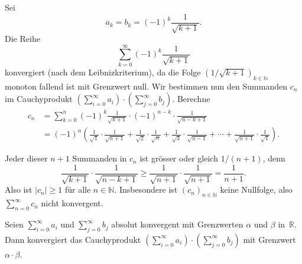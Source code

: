 \documentclass[../main.tex]{subfiles}
\begin{document}
\begin{example}
  Sei 
  \[
    a_k = b_k = {(-1)}^k \frac{1}{\sqrt{k+1}}.
  \]
  Die Reihe
  \[
    \sum_{k=0}^{\infty} {(-1)}^k \frac{1}{\sqrt{k+1}}
  \]
  konvergiert (nach dem Leibnizkriterium),
  da die Folge ${(1/\sqrt{k+1})}_{k \in \mathbb{N}}$
  monoton fallend ist mit Grenzwert null.
  Wir bestimmen nun den Summanden $c_n$ im
  Cauchyprodukt
  $\left( \sum_{i=0}^{\infty} a_i \right) \cdot
  \left( \sum_{j=0}^{\infty} b_j \right)$.
  Berechne
  \begin{align*}
    c_n & = \sum_{k=0}^{n} {(-1)}^k \frac{1}{\sqrt{k+1}}
    \cdot {(-1)}^{n-k} \cdot \frac{1}{\sqrt{n-k+1}} \\
        &=
    (-1)^n \left(  
      \frac{1}{\sqrt 1} \cdot \frac{1}{\sqrt{n+1}}
      + \frac{1}{\sqrt 2} \cdot \frac{1}{\sqrt n}
      + \frac{1}{\sqrt 3} \cdot \frac{1}{\sqrt{n-1}}
      + \cdots
      + \frac{1}{\sqrt{n+1}} \cdot \frac{1}{\sqrt 1}
    \right).
  \end{align*}
\end{example}
Jeder dieser $n + 1$ Summanden in $c_n$ ist grösser oder
gleich $1/(n+1)$, denn
\[
  \frac{1}{\sqrt{k+1}}\cdot\frac{1}{\sqrt{n-k+1}}
  \geq \frac{1}{\sqrt{n+1}} \cdot \frac{1}{\sqrt{n+1}}
  = \frac{1}{n+1}.
\]
Also ist $|c_n| \geq 1$ für alle $n \in \mathbb{N}$.
Insbesondere ist ${(c_{n})}_{n \in \mathbb{N}}$ 
keine Nullfolge,
also $\sum_{n=0}^{\infty} c_n$ nicht konvergent.

\begin{manualtheorem}{4}
  Seien
  $\sum_{i=0}^{\infty} a_i$ und $\sum_{j=0}^{\infty} b_j$ 
  absolut konvergent mit Grenzwerten $\alpha$ und $\beta$ 
  in~$\mathbb{R}$.
  Dann konvergiert das Cauchyprodukt
  $\left( \sum_{i=0}^{\infty} a_i \right) \cdot
  \left( \sum_{j=0}^{\infty} b_j \right)$ mit
  Grenzwert $\alpha \cdot \beta$.
\end{manualtheorem}
\end{document}
